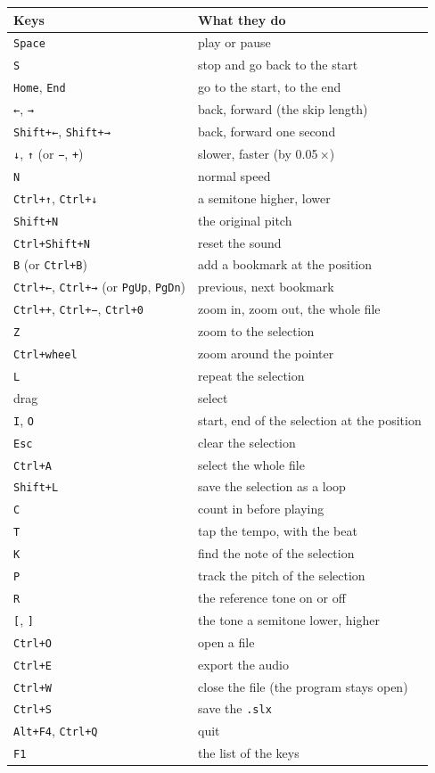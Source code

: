 \documentclass[12pt,
              article,
              oneside
              ]{memoir}
\newcommand*{\key}[1]{\texttt{#1}}
\begin{document}
%
\begin{longtable}{@{}p{}p{}@{}}
\toprule
\textbf{Keys} & \textbf{What they do}\\
\midrule
\endhead
\key{Space} & play or pause\\
\key{S} & stop and go back to the start\\
\key{Home}, \key{End} & go to the start, to the end\\
\key{←}, \key{→} & back, forward (the skip length)\\
\key{Shift+←}, \key{Shift+→} & back, forward one second\\
\key{↓}, \key{↑} (or \key{−}, \key{+}) & slower, faster (by 0.05\,×)\\
\key{N} & normal speed\\
\key{Ctrl+↑}, \key{Ctrl+↓} & a semitone higher, lower\\
\key{Shift+N} & the original pitch\\
\key{Ctrl+Shift+N} & reset the sound\\
\key{B} (or \key{Ctrl+B}) & add a bookmark at the position\\
\key{Ctrl+←}, \key{Ctrl+→} (or \key{PgUp}, \key{PgDn}) & previous, next bookmark\\
\key{Ctrl++}, \key{Ctrl+−}, \key{Ctrl+0} & zoom in, zoom out, the whole file\\
\key{Z} & zoom to the selection\\
\key{Ctrl+wheel} & zoom around the pointer\\
\key{L} & repeat the selection\\
drag & select\\
\key{I}, \key{O} & start, end of the selection at the position\\
\key{Esc} & clear the selection\\
\key{Ctrl+A} & select the whole file\\
\key{Shift+L} & save the selection as a loop\\
\key{C} & count in before playing\\
\key{T} & tap the tempo, with the beat\\
\key{K} & find the note of the selection\\
\key{P} & track the pitch of the selection\\
\key{R} & the reference tone on or off\\
\key{[}, \key{]} & the tone a semitone lower, higher\\
\key{Ctrl+O} & open a file\\
\key{Ctrl+E} & export the audio\\
\key{Ctrl+W} & close the file (the program stays open)\\
\key{Ctrl+S} & save the \texttt{.slx}\\
\key{Alt+F4}, \key{Ctrl+Q} & quit\\
\key{F1} & the list of the keys\\
\bottomrule
\end{longtable}
\end{document}
